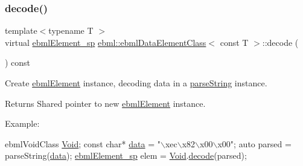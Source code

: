 \mbox{\label{classebml_1_1ebmlDataElementClass_3_01const_01T_01_4_a02806c600c51c291303fbac56d9db70a}} 
\subsubsection{\texorpdfstring{decode()}{decode()}\hspace{0.1cm}{\footnotesize\ttfamily [1/2]}}
{\footnotesize\ttfamily template$<$typename T $>$ \\
virtual \mbox{\hyperlink{namespaceebml_adad533b7705a16bb360fe56380c5e7be}{ebml\+Element\+\_\+sp}} \mbox{\hyperlink{classebml_1_1ebmlDataElementClass}{ebml\+::ebml\+Data\+Element\+Class}}$<$ const T $>$\+::decode (\begin{DoxyParamCaption}\item[{const \mbox{\hyperlink{classebml_1_1parseString}{parse\+String}} \&}]{ }\end{DoxyParamCaption}) const\hspace{0.3cm}{\ttfamily [virtual]}}

Create \mbox{\hyperlink{classebml_1_1ebmlElement}{ebml\+Element}} instance, decoding data in a \mbox{\hyperlink{classebml_1_1parseString}{parse\+String}} instance.

\begin{DoxyReturn}{Returns}
Shared pointer to new \mbox{\hyperlink{classebml_1_1ebmlElement}{ebml\+Element}} instance.
\end{DoxyReturn}
Example\+: 
\begin{DoxyCode}
ebmlVoidClass \mbox{\hyperlink{namespaceebml_afbfd509d1cb71e416a07253746e886e9}{Void}};
\textcolor{keyword}{const} \textcolor{keywordtype}{char}* \mbox{\hyperlink{namespaceebml_a6365629b3110a3c5d0cde94d08aac26c}{data}} = \textcolor{stringliteral}{"\(\backslash\)xec\(\backslash\)x82\(\backslash\)x00\(\backslash\)x00"};
\textcolor{keyword}{auto} parsed = parseString(\mbox{\hyperlink{namespaceebml_a6365629b3110a3c5d0cde94d08aac26c}{data}});
\mbox{\hyperlink{namespaceebml_adad533b7705a16bb360fe56380c5e7be}{ebmlElement\_sp}} elem = \mbox{\hyperlink{namespaceebml_afbfd509d1cb71e416a07253746e886e9}{Void}}.\mbox{\hyperlink{classebml_1_1ebmlElementClass_a9bda26f54e5d5a1e27aaaf0e124ec457}{decode}}(parsed);
\end{DoxyCode}
 

